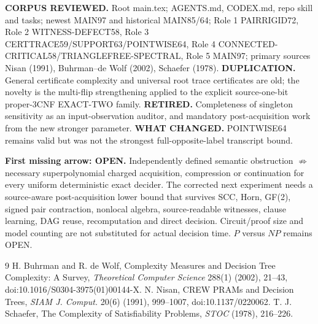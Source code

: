 \documentclass[10pt]{article}
\begin{document}
\textbf{CORPUS REVIEWED.} Root main.tex; AGENTS.md, CODEX.md, repo skill and tasks; newest MAIN97 and historical MAIN85/64; Role 1 PAIRRIGID72, Role 2 WITNESS-DEFECT58, Role 3 CERTTRACE59/SUPPORT63/POINTWISE64, Role 4 CONNECTED-CRITICAL58/TRIANGLEFREE-SPECTRAL, Role 5 MAIN97; primary sources Nisan (1991), Buhrman--de Wolf (2002), Schaefer (1978). \textbf{DUPLICATION.} General certificate complexity and universal root trace certificates are old; the novelty is the multi-flip strengthening applied to the explicit source-one-bit proper-3CNF EXACT-TWO family. \textbf{RETIRED.} Completeness of singleton sensitivity as an input-observation auditor, and mandatory post-acquisition work from the new stronger parameter. \textbf{WHAT CHANGED.} POINTWISE64 remains valid but was not the strongest full-opposite-label transcript bound.

\textbf{First missing arrow: OPEN.} Independently defined semantic obstruction $\not\Rightarrow$ necessary superpolynomial charged acquisition, compression or continuation for every uniform deterministic exact decider. The corrected next experiment needs a source-aware post-acquisition lower bound that survives SCC, Horn, GF(2), signed pair contraction, nonlocal algebra, source-readable witnesses, clause learning, DAG reuse, recomputation and direct decision. Circuit/proof size and model counting are not substituted for actual decision time. $P$ versus $NP$ remains OPEN.

\begin{thebibliography}{9}
 H. Buhrman and R. de Wolf, Complexity Measures and Decision Tree Complexity: A Survey, \emph{Theoretical Computer Science} 288(1) (2002), 21--43, doi:10.1016/S0304-3975(01)00144-X.
 N. Nisan, CREW PRAMs and Decision Trees, \emph{SIAM J. Comput.} 20(6) (1991), 999--1007, doi:10.1137/0220062.
 T. J. Schaefer, The Complexity of Satisfiability Problems, \emph{STOC} (1978), 216--226.
\end{thebibliography}
\end{document}
